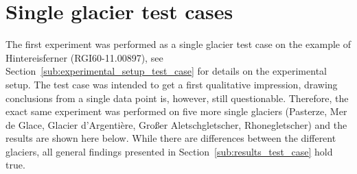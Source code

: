 
\chapter{Single glacier test cases}\label{appendix_A}
\thispagestyle{plain}

The first experiment was performed as a single glacier test case on the example of Hintereisferner (RGI60-11.00897), see Section~\ref{sub:experimental_setup_test_case} for details on the experimental setup. The test case was intended to get a first qualitative impression, drawing conclusions from a single data point is, however, still questionable. Therefore, the exact same experiment was performed on five more single glaciers (Pasterze, Mer de Glace, Glacier d'Argentière, Großer Aletschgletscher, Rhonegletscher) and the results are shown here below. While there are differences between the different glaciers, all general findings presented in Section~\ref{sub:results_test_case} hold true.

